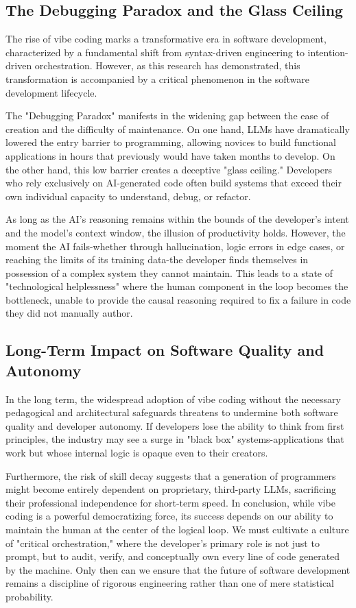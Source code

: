 \documentclass[../tanulmany.tex]{subfiles}
\begin{document}
\subsection{The Debugging Paradox and the Glass Ceiling}

The rise of vibe coding marks a transformative era in software development, characterized by a fundamental shift from syntax-driven engineering to intention-driven orchestration. However, as this research has demonstrated, this transformation is accompanied by a critical phenomenon in the software development lifecycle.

The "Debugging Paradox" manifests in the widening gap between the ease of creation and the difficulty of maintenance. On one hand, LLMs have dramatically lowered the entry barrier to programming, allowing novices to build functional applications in hours that previously would have taken months to develop. \cite{finnie2022robots} On the other hand, this low barrier creates a deceptive "glass ceiling." Developers who rely exclusively on AI-generated code often build systems that exceed their own individual capacity to understand, debug, or refactor. 

As long as the AI's reasoning remains within the bounds of the developer's intent and the model's context window, the illusion of productivity holds. However, the moment the AI fails-whether through hallucination, logic errors in edge cases, or reaching the limits of its training data-the developer finds themselves in possession of a complex system they cannot maintain. This leads to a state of "technological helplessness" where the human component in the loop becomes the bottleneck, unable to provide the causal reasoning required to fix a failure in code they did not manually author.

\subsection{Long-Term Impact on Software Quality and Autonomy}

In the long term, the widespread adoption of vibe coding without the necessary pedagogical and architectural safeguards threatens to undermine both software quality and developer autonomy. If developers lose the ability to think from first principles, the industry may see a surge in "black box" systems-applications that work but whose internal logic is opaque even to their creators. 

Furthermore, the risk of skill decay suggests that a generation of programmers might become entirely dependent on proprietary, third-party LLMs, sacrificing their professional independence for short-term speed. \cite{macnamara2024does} In conclusion, while vibe coding is a powerful democratizing force, its success depends on our ability to maintain the human at the center of the logical loop. We must cultivate a culture of "critical orchestration," where the developer’s primary role is not just to prompt, but to audit, verify, and conceptually own every line of code generated by the machine. Only then can we ensure that the future of software development remains a discipline of rigorous engineering rather than one of mere statistical probability.
\end{document}
